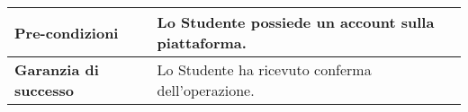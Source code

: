 \begin{longtable}[c]{|l|l|}
		\textbf{Pre-condizioni}                                                                           & Lo Studente possiede un account sulla piattaforma.                                                                                                                                                                                                                                                                                                                                                                                                                                                                                                                                                                                                                                                                                                                                                                                                                                                                                                                                                                                                                                                                                     \\ \hline
		\textbf{Garanzia di successo}                                                                     & Lo Studente ha ricevuto conferma dell'operazione.                                                                                                                                                                                                                                                                                                                                                                                                                                                                                                                                                                                                                                                                                                                                                                                                                                                                                                                                                                                                                                                                                      \\ \hline

\end{longtable}
